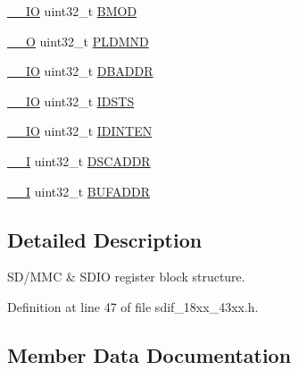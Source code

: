 \begin{DoxyCompactItemize}
\item 
\hyperlink{core__sc300_8h_aec43007d9998a0a0e01faede4133d6be}{\+\_\+\+\_\+\+IO} uint32\+\_\+t \hyperlink{struct_l_p_c___s_d_m_m_c___t_a31d2a920d865a8fb0905448222ec8d6e}{B\+M\+OD}
\item 
\hyperlink{core__sc300_8h_a7e25d9380f9ef903923964322e71f2f6}{\+\_\+\+\_\+O} uint32\+\_\+t \hyperlink{struct_l_p_c___s_d_m_m_c___t_aaf0203775caca284444c5fca1c385224}{P\+L\+D\+M\+ND}
\item 
\hyperlink{core__sc300_8h_aec43007d9998a0a0e01faede4133d6be}{\+\_\+\+\_\+\+IO} uint32\+\_\+t \hyperlink{struct_l_p_c___s_d_m_m_c___t_a674862ec48e5b392ff81b620fda3da62}{D\+B\+A\+D\+DR}
\item 
\hyperlink{core__sc300_8h_aec43007d9998a0a0e01faede4133d6be}{\+\_\+\+\_\+\+IO} uint32\+\_\+t \hyperlink{struct_l_p_c___s_d_m_m_c___t_ad50c21091e980af7e8dd0a5eb4f75d4c}{I\+D\+S\+TS}
\item 
\hyperlink{core__sc300_8h_aec43007d9998a0a0e01faede4133d6be}{\+\_\+\+\_\+\+IO} uint32\+\_\+t \hyperlink{struct_l_p_c___s_d_m_m_c___t_adff53d66e2137fb0569e46d5c771822e}{I\+D\+I\+N\+T\+EN}
\item 
\hyperlink{core__sc300_8h_af63697ed9952cc71e1225efe205f6cd3}{\+\_\+\+\_\+I} uint32\+\_\+t \hyperlink{struct_l_p_c___s_d_m_m_c___t_a7d53c194e4929800bd724142ba2aa949}{D\+S\+C\+A\+D\+DR}
\item 
\hyperlink{core__sc300_8h_af63697ed9952cc71e1225efe205f6cd3}{\+\_\+\+\_\+I} uint32\+\_\+t \hyperlink{struct_l_p_c___s_d_m_m_c___t_a330db89ebea4b6cfbdfa440390361a8a}{B\+U\+F\+A\+D\+DR}
\end{DoxyCompactItemize}


\subsection{Detailed Description}
S\+D/\+M\+MC \& S\+D\+IO register block structure. 

Definition at line 47 of file sdif\+\_\+18xx\+\_\+43xx.\+h.



\subsection{Member Data Documentation}
\mbox{\label{struct_l_p_c___s_d_m_m_c___t_a66f261cc56afffc8214127f088645bb7}} 
